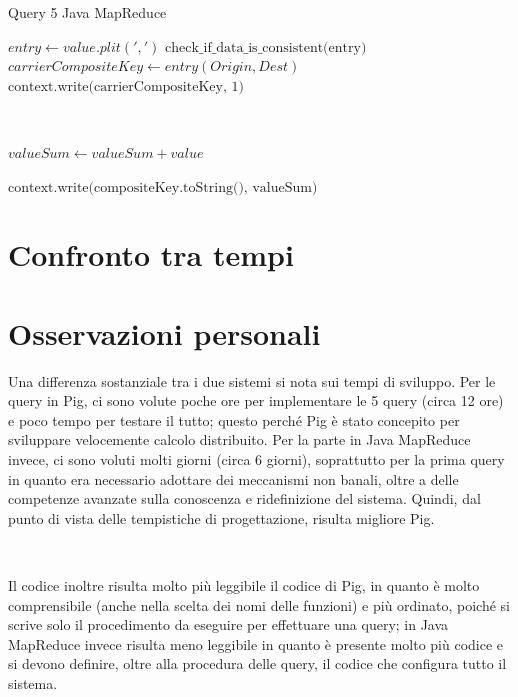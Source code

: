 \documentclass[11pt]{article} %
\begin{document}
\begin{algorithm}
\caption{Query 5 Java MapReduce}\label{euclid}
\begin{algorithmic}[0]


\State $entry \gets value.plit(',')$
\State $\text{check\_if\_data\_is\_consistent(entry)}$
\State $carrierCompositeKey \gets entry(Origin, Dest)$
\State $\text{context.write(carrierCompositeKey, 1)}$

\EndProcedure

~


	\State $valueSum \gets valueSum + value$
\EndFor

\State $\text{context.write(compositeKey.toString(), valueSum)}$

\EndProcedure


\end{algorithmic}
\end{algorithm}


\section{Confronto tra tempi}


\section{Osservazioni personali}

Una differenza sostanziale tra i due sistemi si nota sui tempi di sviluppo. Per le query in Pig, ci sono volute poche ore per implementare le 5 query (circa 12 ore) e poco tempo per testare il tutto; questo perché Pig è stato concepito per sviluppare velocemente calcolo distribuito. Per la parte in Java MapReduce invece, ci sono voluti molti giorni (circa 6 giorni), soprattutto per la prima query in quanto era necessario adottare dei meccanismi non banali, oltre a delle competenze avanzate sulla conoscenza e ridefinizione del sistema. Quindi, dal punto di vista delle tempistiche di progettazione, risulta migliore Pig.

~

Il codice inoltre risulta molto più leggibile il codice di Pig, in quanto è molto comprensibile (anche nella scelta dei nomi delle funzioni) e più ordinato, poiché si scrive solo il procedimento da eseguire per effettuare una query; in Java MapReduce invece risulta meno leggibile in quanto è presente molto più codice e si devono definire, oltre alla procedura delle query, il codice che configura tutto il sistema.
\end{document}
